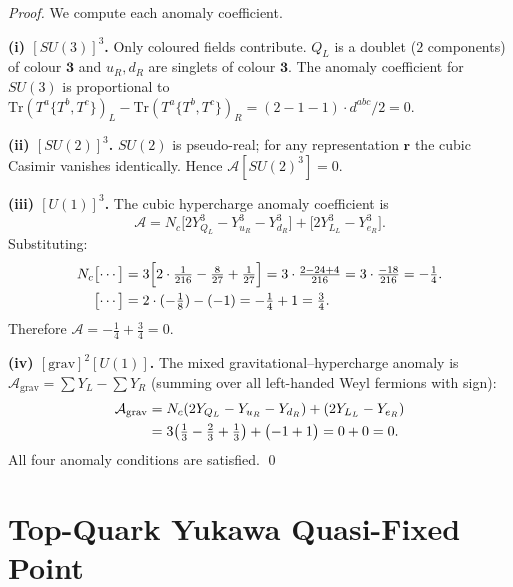 \begin{proof}
We compute each anomaly coefficient.

\noindent\textbf{(i) $[SU(3)]^3$.}
Only coloured fields contribute.  $Q_L$ is a doublet ($2$ components)
of colour $\mathbf{3}$ and $u_R, d_R$ are singlets of colour $\mathbf{3}$.
The anomaly coefficient for $SU(3)$ is proportional to
$\mathrm{Tr}(T^a\{T^b,T^c\})_L - \mathrm{Tr}(T^a\{T^b,T^c\})_R
= (2-1-1)\cdot d^{abc}/2 = 0$.

\noindent\textbf{(ii) $[SU(2)]^3$.}
$SU(2)$ is pseudo-real; for any representation $\mathbf{r}$ the cubic
Casimir vanishes identically.  Hence $\mathcal{A}[SU(2)^3]=0$.

\noindent\textbf{(iii) $[U(1)]^3$.}
The cubic hypercharge anomaly coefficient is
\begin{equation}
  \mathcal{A} = N_c\bigl[2Y_{Q_L}^3 - Y_{u_R}^3 - Y_{d_R}^3\bigr]
               + \bigl[2Y_{L_L}^3 - Y_{e_R}^3\bigr].
\end{equation}
Substituting:
\begin{align}
  N_c\bigl[\cdots\bigr]
    &= 3\Bigl[2\cdot\tfrac{1}{216} - \tfrac{8}{27} + \tfrac{1}{27}\Bigr]
     = 3\cdot\tfrac{2-24+4}{216} = 3\cdot\tfrac{-18}{216}
     = -\tfrac{1}{4}. \\
  \bigl[\cdots\bigr]
    &= 2\cdot(-\tfrac{1}{8}) - (-1)
     = -\tfrac{1}{4} + 1 = \tfrac{3}{4}.
\end{align}
Therefore $\mathcal{A} = -\tfrac{1}{4}+\tfrac{3}{4} = 0$.

\noindent\textbf{(iv) $[\mathrm{grav}]^2[U(1)]$.}
The mixed gravitational–hypercharge anomaly is
$\mathcal{A}_{\mathrm{grav}} = \sum Y_L - \sum Y_R$
(summing over all left-handed Weyl fermions with sign):
\begin{align}
  \mathcal{A}_{\mathrm{grav}}
    &= N_c(2Y_{Q_L} - Y_{u_R} - Y_{d_R}) + (2Y_{L_L} - Y_{e_R}) \notag\\
    &= 3\bigl(\tfrac{1}{3}-\tfrac{2}{3}+\tfrac{1}{3}\bigr)
      + \bigl(-1+1\bigr) = 0+0 = 0.
\end{align}
All four anomaly conditions are satisfied.  \qed
\end{proof}

\section{Top-Quark Yukawa Quasi-Fixed Point}
\label{sec:scarab-top-fp}

